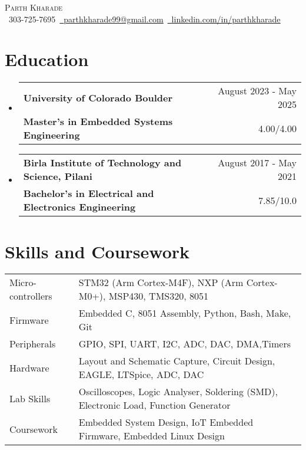 \documentclass[11pt]{article}
\makeatletter
\newcommand{\resumeSubheading}[4]{
  \vspace{-2pt}\item
    \begin{tabular*}{1.0\textwidth}[t]{l@{\extracolsep{\fill}}r}
       {\large \textbf{#1}}&{\large #2} \\
      \textbf{#3}&{ #4} \\
    \end{tabular*}\vspace{-1pt}
}
\newcommand{\resumeSubHeadingListStart}{\begin{itemize}[leftmargin=0.0in, label={}]}
\newcommand{\resumeSubHeadingListEnd}{\end{itemize}}
\makeatother
\begin{document}
\setlength{\footskip}{4.1pt}
\begin{center}
    {\huge \scshape Parth Kharade} \\ \vspace{1pt}
    \small \raisebox{-0.1\height}\faPhone\ 303-725-7695{\hspace{0.1cm}}~\href{mailto:parthkharade99@gmail.com}{\raisebox{-0.2\height}\faEnvelope\ \underline{parthkharade99@gmail.com}}~{\hspace{0.1cm}}\href{https://www.linkedin.com/in/parth-k-081287184/}{\raisebox{-0.2\height}\faLinkedin\ \underline{linkedin.com/in/parthkharade}}
    \vspace{-10pt}
\end{center}


\section {Education}
  \resumeSubHeadingListStart
    \resumeSubheading
      {University of Colorado Boulder}{August 2023 - May 2025}
      {Master's in Embedded Systems Engineering}{4.00/4.00}
      \vspace{-0.1in}
    \resumeSubheading
      {Birla Institute of Technology and Science, Pilani}{August 2017 - May 2021}
      {Bachelor's in Electrical and Electronics Engineering}{7.85/10.0}
  \resumeSubHeadingListEnd
 \vspace{-16pt}
 \section{Skills and Coursework}
 \vspace{-4mm}
\begin{table}[!htb]
    \begin{tabular} { m{3.1cm} | m{16cm} } 
      {Micro-controllers}&{\: STM32 (Arm Cortex-M4F), NXP (Arm Cortex-M0+), MSP430, TMS320, 8051} \\
      {Firmware}&{\: Embedded C, 8051 Assembly, Python, Bash, Make, Git} \\
      {Peripherals}&{\: GPIO, SPI, UART, I2C, ADC, DAC, DMA,Timers} \\
      {Hardware}&{\: Layout and Schematic Capture, Circuit Design, EAGLE, LTSpice, ADC, DAC} \\
      {Lab Skills}&{\: Oscilloscopes, Logic Analyser, Soldering (SMD), Electronic Load, Function Generator} \\
      {Coursework}&{\: Embedded System Design, IoT Embedded Firmware, Embedded Linux Design} \\
    \end{tabular}
\end{table}
 \vspace{-16pt}
\end{document}
